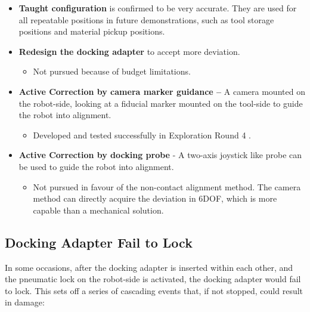 \begin{itemize}
	\item \textbf{Taught configuration} is confirmed to be very accurate. They are used for all repeatable positions in future demonstrations, such as tool storage positions and material pickup positions.

	\item \textbf{Redesign the docking adapter} to accept more deviation.

\begin{itemize}
	\item Not pursued because of budget limitations.

\end{itemize}
	\item \textbf{Active Correction by camera marker guidance --} A camera mounted on the robot-side, looking at a fiducial marker mounted on the tool-side to guide the robot into alignment.

\begin{itemize}
	\item Developed and tested successfully in Exploration Round 4 .

\end{itemize}
	\item  \textbf{Active Correction by docking probe} - A two-axis joystick like probe can be used to guide the robot into alignment.

\begin{itemize}
	\item Not pursued in favour of the non-contact alignment method. The camera method can directly acquire the deviation in 6DOF, which is more capable than a mechanical solution.

\end{itemize}
\end{itemize}

\subsection{Docking Adapter Fail to Lock}
\label{subsection:exploration-3-docking-adapter-fail-to-lock}

In some occasions, after the docking adapter is inserted within each other, and the pneumatic lock on the robot-side is activated, the docking adapter would fail to lock. This sets off a series of cascading events that, if not stopped, could result in damage:

